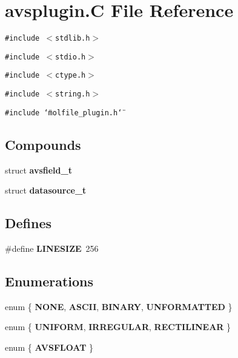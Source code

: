 \section{avsplugin.C File Reference}
\label{avsplugin_8C}
{\tt \#include $<$stdlib.h$>$}\par
{\tt \#include $<$stdio.h$>$}\par
{\tt \#include $<$ctype.h$>$}\par
{\tt \#include $<$string.h$>$}\par
{\tt \#include \char`\"{}molfile\_\-plugin.h\char`\"{}}\par
\subsection*{Compounds}
\begin{CompactItemize}
\item 
struct {\bf avsfield\_\-t}
\item 
struct {\bf datasource\_\-t}
\end{CompactItemize}
\subsection*{Defines}
\begin{CompactItemize}
\item 
\#define {\bf LINESIZE}\ 256
\end{CompactItemize}
\subsection*{Enumerations}
\begin{CompactItemize}
\item 
enum \{ {\bf NONE}, 
{\bf ASCII}, 
{\bf BINARY}, 
{\bf UNFORMATTED}
 \}
\item 
enum \{ {\bf UNIFORM}, 
{\bf IRREGULAR}, 
{\bf RECTILINEAR}
 \}
\item 
enum \{ {\bf AVSFLOAT}
 \}
\end{CompactItemize}

